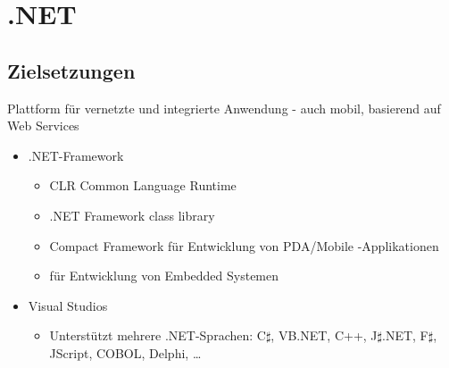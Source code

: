 \section{.NET}
\subsection{Zielsetzungen}
Plattform für vernetzte und integrierte Anwendung - auch mobil, basierend auf Web Services
\begin{itemize}
  \item .NET-Framework
		\begin{itemize}
		\item CLR Common Language Runtime
		\item .NET Framework class library
		\item Compact Framework für Entwicklung von PDA/Mobile -Applikationen
		\item {} für Entwicklung von Embedded Systemen
	\end{itemize}
	\item  Visual Studios
	\begin{itemize}
  	\item Unterstützt mehrere .NET-Sprachen: C$\sharp$, VB.NET, C++, J$\sharp$.NET, F$\sharp$, JScript, COBOL, Delphi, \dots	
	\end{itemize}
\end{itemize}

